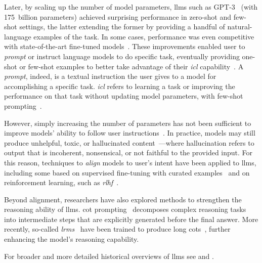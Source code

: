Later, by scaling up the number of model parameters, \acfp{llm} such as GPT-3~\cite{gpt_lm_few_shot_learners_2020} (with 175~billion parameters) achieved surprising performance in zero-shot and few-shot settings, the latter extending the former by providing a handful of natural-language examples of the task. In some cases, performance was even competitive with state-of-the-art fine-tuned models~\cite{gpt_lm_few_shot_learners_2020}.
%
These improvements enabled user to \emph{prompt} or instruct language models to do specific task, eventually providing one-shot or few-shot examples to better take advantage of their \emph{\acf{icl}} capability~\cite{jm3}. A \emph{prompt}, indeed, is a textual instruction the user gives to a model for accomplishing a specific task. \emph{\Ac{icl}} refers to learning a task or improving the performance on that task without updating model parameters, \eg with few-shot prompting~\cite{jm3}.

However, simply increasing the number of parameters has not been sufficient to improve models' ability to follow user instructions~\cite{instruct_gpt_2022}. In practice, models may still produce unhelpful, toxic, or hallucinated content~\cite{maynez-etal-2020-faithfulness-hallucination,ji_etal-2023-survey-hallucination}---where hallucination refers to output that is incoherent, nonsensical, or not faithful to the provided input.
For this reason, techniques to \emph{align} models to user's intent have been applied to \acp{llm}, including some based on supervised fine-tuning with curated examples~\cite{zhou2023lima} and on reinforcement learning, such as \emph{\acf{rlhf}}~\cite{instruct_gpt_2022}.

Beyond alignment, researchers have also explored methods to strengthen the reasoning ability of \acp{llm}. \Acf{cot} prompting~\cite{wei2022chainofthought} decomposes complex reasoning tasks into intermediate steps that are explicitly generated before the final answer. More recently, so-called \emph{\acfp{lrm}}~\cite{tie2025surveyposttraininglargelanguage} have been trained to produce long \aclp{cot}~\cite{openai2024openaio1card,deepseekai2025deepseekr1incentivizingreasoningcapability}, further enhancing the model's reasoning capability.

For broader and more detailed historical overviews of \acp{llm} see \textcite{Zhou2024_from_bert_to_chat} and \textcite{tie2025surveyposttraininglargelanguage}.


